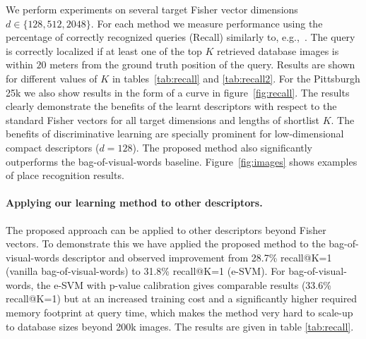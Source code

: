 \documentclass[10pt,twocolumn,letterpaper]{article}
\begin{document}
      We perform experiments on several target Fisher vector dimensions $d\in\{128,512,2048\}$. For each method we measure performance using the percentage of correctly recognized queries (Recall) similarly to, e.g.,~\cite{Chen11,Knopp2010,Sattler-BMVC12}. The query is correctly localized if at least one of the top $K$ retrieved database images is within $20$ meters from the ground truth position of the query. Results are shown for different values of $K$ in tables~\ref{tab:recall} and \ref{tab:recall2}. For the Pittsburgh 25k we also show results in the form of a curve in figure~\ref{fig:recall}. The results clearly demonstrate the benefits of the learnt descriptors with respect to the standard Fisher vectors for all target dimensions and lengths of shortlist $K$. The benefits of discriminative learning are specially prominent for low-dimensional compact descriptors ($d=128$). 
      The proposed method also significantly outperforms the bag-of-visual-words baseline. Figure~\ref{fig:images} shows examples of place recognition results. 

      \paragraph{Applying our learning method to other descriptors.}
        \textcolor{petr}{ 
         The proposed approach can be applied to other descriptors beyond Fisher vectors. To demonstrate this we have applied the proposed method to the bag-of-visual-words descriptor and observed improvement from 28.7\% recall@K=1 (vanilla bag-of-visual-words) to 31.8\% recall@K=1 (e-SVM). For bag-of-visual-words, the e-SVM with p-value calibration gives comparable results (33.6\% recall@K=1) but at an increased training cost and a significantly higher required memory footprint at query time, which makes the method very hard to scale-up to database sizes beyond 200k images. The results are given in table \ref{tab:recall}.
        }
\end{document}
